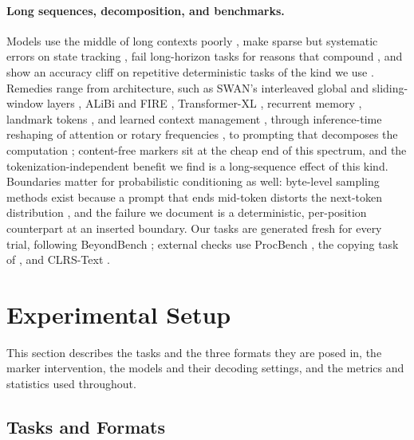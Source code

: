\documentclass[10pt]{article} %
\begin{document}
\paragraph{Long sequences, decomposition, and benchmarks.} Models use the middle of long contexts poorly \citep{liu2024lost}, make sparse but systematic errors on state tracking \citep{liu2023flipflop}, fail long-horizon tasks for reasons that compound \citep{wang2026mirage, pushkin2026lead, anand2026periodic}, and show an accuracy cliff on repetitive deterministic tasks of the kind we use \citep{hou2025focus}. Remedies range from architecture, such as SWAN's interleaved global and sliding-window layers \citep{puvvada2025swan}, ALiBi \citep{press2022alibi} and FIRE \citep{li2024fire}, Transformer-XL \citep{dai2019transformerxl}, recurrent memory \citep{bulatov2022rmt}, landmark tokens \citep{mohtashami2023landmark}, and learned context management \citep{kontonis2026memento}, through inference-time reshaping of attention or rotary frequencies \citep{han2024lminfinite, wang2024resonance}, to prompting that decomposes the computation \citep{zhou2023leasttomost, chen2023pot, nye2021scratchpad}; content-free markers sit at the cheap end of this spectrum, and the tokenization-independent benefit we find is a long-sequence effect of this kind. Boundaries matter for probabilistic conditioning as well: byte-level sampling methods exist because a prompt that ends mid-token distorts the next-token distribution \citep{hayase2025bytesampler}, and the failure we document is a deterministic, per-position counterpart at an inserted boundary. Our tasks are generated fresh for every trial, following BeyondBench \citep{srivastava2025beyondbench}; external checks use ProcBench \citep{fujisawa2024procbench}, the copying task of \citet{jelassi2024repeat}, and CLRS-Text \citep{markeeva2024clrstext}.

\FloatBarrier
\section{Experimental Setup}
\label{sec:setup}

This section describes the tasks and the three formats they are posed in, the marker intervention, the models and their decoding settings, and the metrics and statistics used throughout.

\subsection{Tasks and Formats}
\label{sec:tasks}
\end{document}
